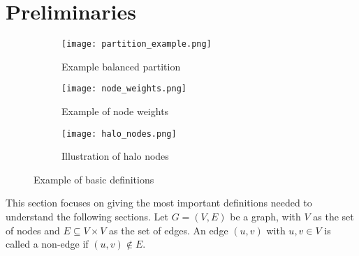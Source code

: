 \documentclass[acmsmall,nonacm,screen,review]{acmart}
\begin{document}
\section{Preliminaries}
\begin{figure}[bt!]
     \centering
     \begin{subfigure}[b]{0.3\textwidth}
         \centering
         \texttt{[image: partition\_example.png]}
         \caption{Example balanced partition}
         \label{partition}
     \end{subfigure}
     \hfill
     \begin{subfigure}[b]{0.3\textwidth}
         \centering
         \texttt{[image: node\_weights.png]}
         \caption{Example of node weights}
         \label{weights}
     \end{subfigure}
     \begin{subfigure}[b]{0.3\textwidth}
        \centering
        \texttt{[image: halo\_nodes.png]}
        \caption{Illustration of halo nodes}
        \label{halo}
     \end{subfigure}
     \caption{Example of basic definitions}
     \label{definitions}
\end{figure}
This section focuses on giving the most important definitions needed to understand the following sections. Let $G=(V,E)$ be a graph, with $V$ as the set of nodes and $E \subseteq V \times V$ as the set of edges. An edge $(u,v)$ with $u,v \in V$ is called a non-edge if $(u,v) \notin E$.
\end{document}
